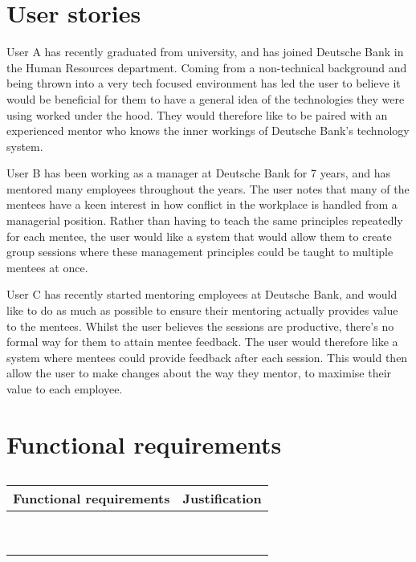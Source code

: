\documentclass[10pt]{article}
\begin{document}
\vspace{-8mm}\section{User stories}\vspace{-2mm}
User A has recently graduated from university, and has joined Deutsche Bank in
the Human Resources department. Coming from a non-technical background and being
thrown into a very tech focused environment has led the user to believe it would
be beneficial for them to have a general idea of the technologies they were
using worked under the hood. They would therefore like to be paired with an
experienced mentor who knows the inner workings of Deutsche Bank's technology
system.

User B has been working as a manager at Deutsche Bank for 7 years, and has
mentored many employees throughout the years. The user notes that many of the
mentees have a keen interest in how conflict in the workplace is handled from a
managerial position. Rather than having to teach the same principles repeatedly
for each mentee, the user would like a system that would allow them to create
group sessions where these management principles could be taught to multiple
mentees at once.

User C has recently started mentoring employees at Deutsche Bank, and would like
to do as much as possible to ensure their mentoring actually provides value to
the mentees. Whilst the user believes the sessions are productive, there's no
formal way for them to attain mentee feedback. The user would therefore like a
system where mentees could provide feedback after each session. This would then
allow the user to make changes about the way they mentor, to maximise their
value to each employee.

\vspace{-4mm}\section{Functional requirements}\vspace{-2mm}
\begin{table}[]
\begin{tabular}{|l|l|}
\hline
Functional requirements & Justification \\ \hline
                        &               \\ \hline
                        &               \\ \hline
                        &               \\ \hline
                        &               \\ \hline
                        &               \\ \hline
                        &               \\ \hline
                        &               \\ \hline
                        &               \\ \hline
                        &               \\ \hline
\end{tabular}
\caption{}
\label{tab:my-table}
\end{table}
\end{document}
